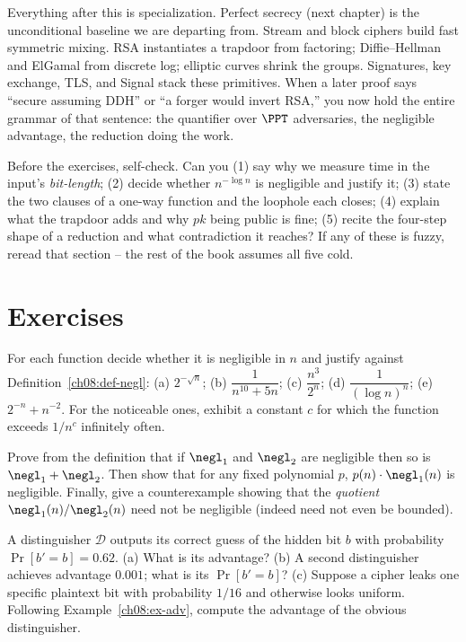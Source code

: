 Everything after this is specialization. Perfect secrecy (next chapter) is the unconditional baseline we are departing from. Stream and block ciphers build fast symmetric mixing. RSA instantiates a trapdoor from factoring; Diffie--Hellman and ElGamal from discrete log; elliptic curves shrink the groups. Signatures, key exchange, TLS, and Signal stack these primitives. When a later proof says ``secure assuming DDH'' or ``a forger would invert RSA,'' you now hold the entire grammar of that sentence: the quantifier over $\PPT$ adversaries, the negligible advantage, the reduction doing the work.

\begin{recoverybox}
Before the exercises, self-check. Can you (1) say why we measure time in the input's \emph{bit-length}; (2) decide whether $n^{-\log n}$ is negligible and justify it; (3) state the two clauses of a one-way function and the loophole each closes; (4) explain what the trapdoor adds and why $pk$ being public is fine; (5) recite the four-step shape of a reduction and what contradiction it reaches? If any of these is fuzzy, reread that section -- the rest of the book assumes all five cold.
\end{recoverybox}

\section{Exercises}
\label{ch08:exercises}

\begin{exercise}
\label{ch08:ex-1}
For each function decide whether it is negligible in $n$ and justify against Definition~\ref{ch08:def-negl}: (a) $2^{-\sqrt n}$; (b) $\dfrac{1}{n^{10}+5n}$; (c) $\dfrac{n^{3}}{2^{n}}$; (d) $\dfrac{1}{(\log n)^{n}}$; (e) $2^{-n} + n^{-2}$. For the noticeable ones, exhibit a constant $c$ for which the function exceeds $1/n^{c}$ infinitely often.
\end{exercise}

\begin{exercise}
\label{ch08:ex-2}
Prove from the definition that if $\negl_1$ and $\negl_2$ are negligible then so is $\negl_1 + \negl_2$. Then show that for any fixed polynomial $p$, $p(n)\cdot\negl_1(n)$ is negligible. Finally, give a counterexample showing that the \emph{quotient} $\negl_1(n)/\negl_2(n)$ need not be negligible (indeed need not even be bounded).
\end{exercise}

\begin{exercise}
\label{ch08:ex-3}
A distinguisher $\mathcal D$ outputs its correct guess of the hidden bit $b$ with probability $\Pr[b'=b] = 0.62$. (a) What is its advantage? (b) A second distinguisher achieves advantage $0.001$; what is its $\Pr[b'=b]$? (c) Suppose a cipher leaks one specific plaintext bit with probability $1/16$ and otherwise looks uniform. Following Example~\ref{ch08:ex-adv}, compute the advantage of the obvious distinguisher.
\end{exercise}


